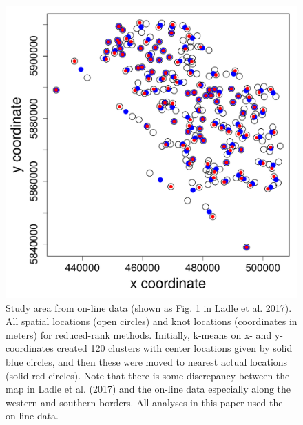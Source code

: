 \documentclass[11pt, titlepage]{article}\usepackage[]{graphicx}\usepackage[]{color}
\begin{document}
\begin{spacing}{1.9}
\begin{flushleft}
\begin{singlespace}
	\begin{figure}
	  \centering
	    \includegraphics[width=\linewidth]{figure/Fig-knotLocs-1.pdf}
	  \caption{Study area from on-line data (shown as Fig. 1 in Ladle et al. 2017). All spatial locations (open circles) and knot locations (coordinates in meters) for reduced-rank methods.  Initially, k-means on x- and y-coordinates created 120 clusters with center locations given by solid blue circles, and then these were moved to nearest actual locations (solid red circles).  Note that there is some discrepancy between the map in Ladle et al. (2017) and the on-line data especially along the western and southern borders.  All analyses in this paper used the on-line data.}\label{fig:reduRank}
  \end{figure}




\end{singlespace}
\end{flushleft}
\end{spacing}
\end{document}
